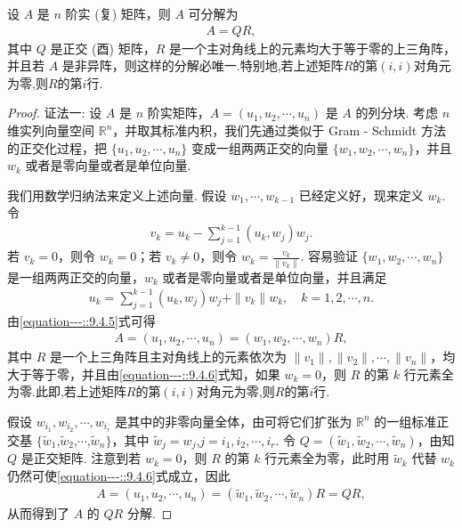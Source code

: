 \documentclass[../../main.tex]{subfiles}
\begin{document}
\begin{theorem}\label{theorem:矩阵的QR分解}
设 $A$ 是 $n$ 阶实 (复) 矩阵，则 $A$ 可分解为
\begin{align*}
A = QR,
\end{align*}
其中 $Q$ 是正交 (酉) 矩阵，$R$ 是一个主对角线上的元素均大于等于零的上三角阵，并且若 $A$ 是非异阵，则这样的分解必唯一.特别地,若上述矩阵$R$的第$(i,i)$对角元为零,则$R$的第$i$行.
\end{theorem}
\begin{proof}
{\color{blue}证法一:}
设 $A$ 是 $n$ 阶实矩阵，$A = (u_1,u_2,\cdots,u_n)$ 是 $A$ 的列分块. 考虑 $n$ 维实列向量空间 $\mathbb{R}^n$，并取其标准内积，我们先通过类似于 Gram - Schmidt 方法的正交化过程，把 $\{u_1,u_2,\cdots,u_n\}$ 变成一组两两正交的向量 $\{w_1,w_2,\cdots,w_n\}$，并且 $w_k$ 或者是零向量或者是单位向量.

我们用数学归纳法来定义上述向量. 假设 $w_1,\cdots,w_{k - 1}$ 已经定义好，现来定义 $w_k$. 令
\begin{align*}
v_k = u_k - \sum_{j = 1}^{k - 1}(u_k,w_j)w_j.
\end{align*}
若 $v_k = 0$，则令 $w_k = 0$；若 $v_k \neq 0$，则令 $w_k = \frac{v_k}{\|v_k\|}$. 容易验证 $\{w_1,w_2,\cdots,w_n\}$ 是一组两两正交的向量，$w_k$ 或者是零向量或者是单位向量，并且满足
\begin{align}
u_k = \sum_{j = 1}^{k - 1}(u_k,w_j)w_j + \|v_k\|w_k,\quad k = 1,2,\cdots,n.\label{equation---::9.4.5}
\end{align}
由\eqref{equation---::9.4.5}式可得
\begin{align}
A = (u_1,u_2,\cdots,u_n) = (w_1,w_2,\cdots,w_n)R,\label{equation---::9.4.6}
\end{align}
其中 $R$ 是一个上三角阵且主对角线上的元素依次为 $\|v_1\|,\|v_2\|,\cdots,\|v_n\|$，均大于等于零，并且由\eqref{equation---::9.4.6}式知，如果 $w_k = 0$，则 $R$ 的第 $k$ 行元素全为零.此即,若上述矩阵$R$的第$(i,i)$对角元为零,则$R$的第$i$行.

假设 $w_{i_1},w_{i_2},\cdots,w_{i_r}$ 是其中的非零向量全体，由可将它们扩张为 $\mathbb{R}^n$ 的一组标准正交基 $\{\widetilde{w}_1$,$\widetilde{w}_2$,$\cdots$,$\widetilde{w}_n\}$，其中 $\widetilde{w}_j = w_j$,$j = i_1,i_2,\cdots,i_r$. 令 $Q = (\widetilde{w}_1,\widetilde{w}_2,\cdots,\widetilde{w}_n)$，由知 $Q$ 是正交矩阵. 注意到若 $w_k = 0$，则 $R$ 的第 $k$ 行元素全为零，此时用 $\widetilde{w}_k$ 代替 $w_k$ 仍然可使\eqref{equation---::9.4.6}式成立，因此
\begin{align*}
A = (u_1,u_2,\cdots,u_n) = (\widetilde{w}_1,\widetilde{w}_2,\cdots,\widetilde{w}_n)R = QR,
\end{align*}
从而得到了 $A$ 的 $QR$ 分解.


\end{proof}
\end{document}
